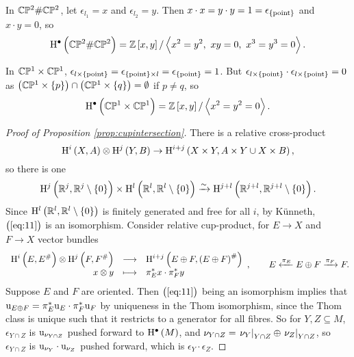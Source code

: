 \begin{example*}
In $ \mathbb{C}\mathbb{P}^2 \# \mathbb{C}\mathbb{P}^2 $, let $ \epsilon_{l_1} = x $ and $ \epsilon_{l_2} = y $. Then $ x \cdot x = y \cdot y = 1 = \epsilon_{\pt} $ and $ x \cdot y = 0 $, so
$$ \H^\bullet\br{\CC\PP^2 \# \CC\PP^2} = \ZZ\sbr{x, y} / \abr{x^2 = y^2, \ xy = 0, \ x^3 = y^3 = 0}. $$
\end{example*}

\begin{example*}
In $ \mathbb{C}\mathbb{P}^1 \times \mathbb{C}\mathbb{P}^1 $, $ \epsilon_{l \times \pt} = \epsilon_{\pt \times l} = \epsilon_{\pt} = 1 $. But $ \epsilon_{l \times \pt} \cdot \epsilon_{l \times \pt} = 0 $ as $ \br{\CC\PP^1 \times \cbr{p}} \cap \br{\CC\PP^1 \times \cbr{q}} = \emptyset $ if $ p \ne q $, so
$$ \H^\bullet\br{\CC\PP^1 \times \CC\PP^1} = \ZZ\sbr{x, y} / \abr{x^2 = y^2 = 0}. $$
\end{example*}

\pagebreak

\begin{proof}[Proof of Proposition \ref{prop:cupintersection}]
There is a relative cross-product
$$ \H^i\br{X, A} \otimes \H^j\br{Y, B} \to \H^{i + j}\br{X \times Y, A \times Y \cup X \times B}, $$
so there is one
\begin{equation}
\label{eq:11}
\H^j\br{\RR^j, \RR^j \setminus \cbr{0}} \times \H^l\br{\RR^l, \RR^l \setminus \cbr{0}} \xrightarrow{\sim} \H^{j + l}\br{\RR^{j + l}, \RR^{j + l} \setminus \cbr{0}}.
\end{equation}
Since $ \H^l\br{\RR^l, \RR^l \setminus \cbr{0}} $ is finitely generated and free for all $ i $, by K\"unneth, $ \br{\ref{eq:11}} $ is an isomorphism. Consider relative cup-product, for $ E \to X $ and $ F \to X $ vector bundles
$$ \function{\H^i\br{E, E^\#} \otimes \H^j\br{F, F^\#}}{\H^{i + j}\br{E \oplus F, \br{E \oplus F}^\#}}{x \otimes y}{\pi_E^*x \cdot \pi_F^*y}, \qquad E \xleftarrow{\pi_E} E \oplus F \xrightarrow{\pi_F} F. $$
Suppose $ E $ and $ F $ are oriented. Then $ \br{\ref{eq:11}} $ being an isomorphism implies that $ \mathrm{u}_{E \oplus F} = \pi_E^*\mathrm{u}_E \cdot \pi_F^*\mathrm{u}_F $ by uniqueness in the Thom isomorphism, since the Thom class is unique such that it restricts to a generator for all fibres. So for $ Y, Z \subseteq M $, $ \epsilon_{Y \cap Z} $ is $ \mathrm{u}_{\nu_{Y \cap Z}} $ pushed forward to $ \H^\bullet\br{M} $, and $ \nu_{Y \cap Z} = \left. \nu_Y \right|_{Y \cap Z} \oplus \left. \nu_Z \right|_{Y \cap Z} $, so $ \epsilon_{Y \cap Z} $ is $ \mathrm{u}_{\nu_Y} \cdot \mathrm{u}_{\nu_Z} $ pushed forward, which is $ \epsilon_Y \cdot \epsilon_Z $.
\end{proof}

